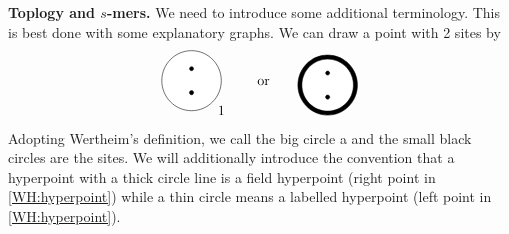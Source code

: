 \documentclass[8.5pt,twoside,twocolumn]{article}
\theoremstyle{standard}
\begin{document}
\textbf{Toplogy and $s$-mers.} We need to introduce some additional terminology. This is best done
with some explanatory graphs. We can draw a point with 2 sites by
\begin{equation}
\begin{tikzpicture}[baseline={(current bounding box.center)}]
  \draw(0,0) node[circle,minimum size=1.5cm,fill=white,draw] (1) {};
  \draw(0,.3) node[circle,inner sep=0cm,minimum size=.1cm,fill=black,draw] (1A) {};
  \draw(0,-.3) node[circle,inner sep=0cm,minimum size=.1cm,fill=black,draw] (1B) {.};
  \node at (.75,-.75) {1};
\end{tikzpicture}
\qquad \te{or} \qquad
\begin{tikzpicture}[baseline={(current bounding box.center)}]
  \draw(0,0) node[circle,minimum size=1.5cm,fill=black,draw] (1) {};
  \draw(0,0) node[circle,minimum size=1.3cm,fill=white,draw] (1) {};
  \draw(0,.3) node[circle,inner sep=0cm,minimum size=.1cm,fill=black,draw] (1A) {};
  \draw(0,-.3) node[circle,inner sep=0cm,minimum size=.1cm,fill=black,draw] (1B) {.};
\end{tikzpicture}
\label{WH:hyperpoint}
\end{equation}
Adopting Wertheim's definition, we call the big circle a  and the small
black circles are the sites. We will additionally introduce the convention that
a hyperpoint with a thick circle line is a field hyperpoint (right point in
\eqref{WH:hyperpoint}) while a thin circle means a labelled hyperpoint (left
point in \eqref{WH:hyperpoint}).
\end{document}
